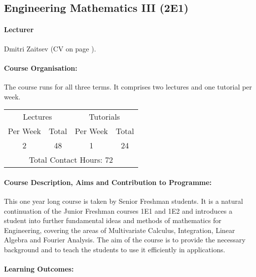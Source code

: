 \subsection{Engineering Mathematics III (2E1)}
\label{Course2E1}
\paragraph{Lecturer}
Dmitri Zaitsev (CV on page \pageref{Dmitri_Zaitsev}).
\paragraph{Course Organisation:}

The course runs for all three terms. It comprises two lectures and one tutorial per week.

\begin{center}
\begin{tabular}{|c|c|c|c|}
\hline
\multicolumn{2}{|c|}{Lectures}&\multicolumn{2}{|c|}{Tutorials}\\
\cline{1-4}
Per Week&Total&Per Week&Total\\
\hline
2&48&1&24\\
\hline
\multicolumn{4}{|c|}{Total Contact Hours: 72}\\
\hline
\end{tabular}
\end{center}

\paragraph{Course Description, Aims and Contribution to Programme:}

This one year long course is taken by Senior Freshman students.
It is a natural continuation of the Junior Freshman courses 1E1
and 1E2 and introduces a student into further fundamental ideas and methods
of mathematics for Engineering, covering the areas of Multivariate
Calculus, Integration, Linear Algebra and Fourier Analysis.
The aim of the course is to provide the necessary background
and to teach the students to use it efficiently in applications.


\paragraph{Learning Outcomes:}

